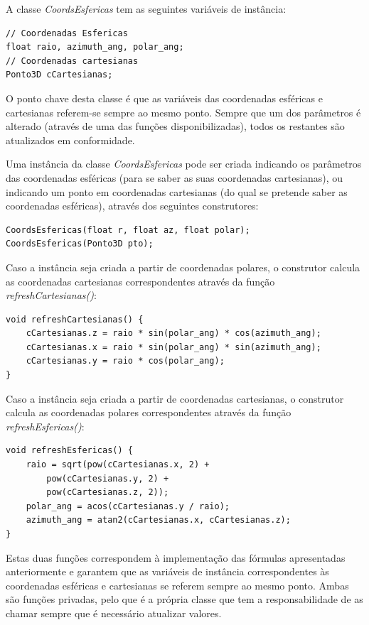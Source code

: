 A classe \textit{CoordsEsfericas} tem as seguintes variáveis de instância:

\begin{Verbatim}
// Coordenadas Esfericas
float raio, azimuth_ang, polar_ang;
// Coordenadas cartesianas
Ponto3D cCartesianas;
\end{Verbatim}

O ponto chave desta classe é que as variáveis das coordenadas esféricas e cartesianas referem-se sempre ao mesmo ponto. Sempre que um dos parâmetros é alterado (através de uma das funções disponibilizadas), todos os restantes são atualizados em conformidade.

Uma instância da classe \textit{CoordsEsfericas} pode ser criada indicando os parâmetros das coordenadas esféricas (para se saber as suas coordenadas cartesianas), ou indicando um ponto em coordenadas cartesianas (do qual se pretende saber as coordenadas esféricas), através dos seguintes construtores:

\begin{Verbatim}
CoordsEsfericas(float r, float az, float polar);
CoordsEsfericas(Ponto3D pto);
\end{Verbatim}

Caso a instância seja criada a partir de coordenadas polares, o construtor calcula as coordenadas cartesianas correspondentes através da função \textit{refreshCartesianas()}:

\begin{Verbatim}
void refreshCartesianas() {
	cCartesianas.z = raio * sin(polar_ang) * cos(azimuth_ang);
	cCartesianas.x = raio * sin(polar_ang) * sin(azimuth_ang);
	cCartesianas.y = raio * cos(polar_ang);
}
\end{Verbatim}

Caso a instância seja criada a partir de coordenadas cartesianas, o construtor calcula as coordenadas polares correspondentes através da função \textit{refreshEsfericas()}:

\begin{Verbatim}
void refreshEsfericas() {
	raio = sqrt(pow(cCartesianas.x, 2) + 
		pow(cCartesianas.y, 2) + 
		pow(cCartesianas.z, 2));
	polar_ang = acos(cCartesianas.y / raio);
	azimuth_ang = atan2(cCartesianas.x, cCartesianas.z);
}
\end{Verbatim}

Estas duas funções correspondem à implementação das fórmulas apresentadas anteriormente e garantem que as variáveis de instância correspondentes às coordenadas esféricas e cartesianas se referem sempre ao mesmo ponto. Ambas são funções privadas, pelo que é a própria classe que tem a responsabilidade de as chamar sempre que é necessário atualizar valores.

